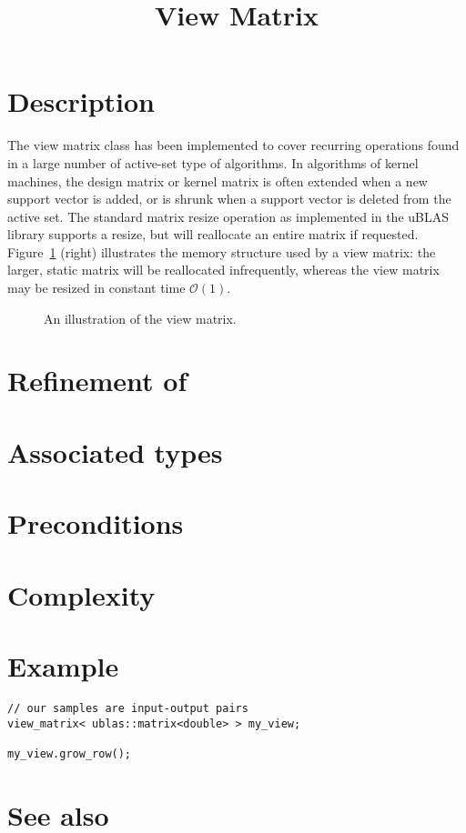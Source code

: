 \documentclass{article}
\begin{document}
\title{View Matrix}
\maketitle


\section*{Description}

The view matrix class has been implemented to cover recurring operations
found in a large number of active-set type of algorithms. In algorithms
of kernel machines, the design matrix or kernel matrix is often extended
when a new support vector is added, or is shrunk when a support vector
is deleted from the active set. The standard matrix resize operation
as implemented in the uBLAS library supports a resize, but will reallocate
an entire matrix if requested. Figure~\ref{figure:view_matrix}
(right) illustrates the memory structure used by a view matrix: the
larger, static matrix will be reallocated infrequently, whereas the
view matrix may be resized in constant time $\mathcal{O}(1)$.

\begin{figure}
\caption{An illustration of the view matrix.}
\label{figure:view_matrix}
\end{figure}


\section*{Refinement of}


\section*{Associated types}

\section*{Preconditions}


\section*{Complexity}


\section*{Example}

\highlightcpp{}
\begin{verbatim}
// our samples are input-output pairs
view_matrix< ublas::matrix<double> > my_view;

my_view.grow_row();

\end{verbatim}


\section*{See also}






\end{document}

